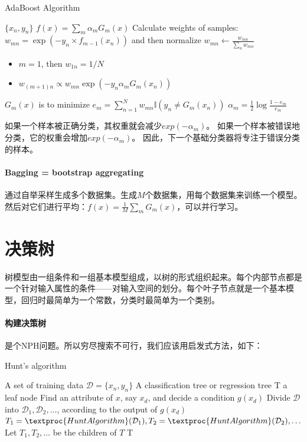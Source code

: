 \begin{algorithm}[H]
\caption{AdaBoost Algorithm}
\label{alg:AdaBoost}
\begin{algorithmic}[1]
\Require $\{x_n, y_n\}$
\Ensure $f(x) = \sum_m \alpha_mG_m(x)$
\State Calculate weights of samples: $w_{mn} = \exp(-y_n \times f_{m-1}(x_n))$ and then
normalize $w_{mn} \leftarrow \frac{w_{mn}}{\sum_n w_{mn}}$\begin{itemize}
    \item $m=1$, then $w_{1n} = 1/N$
    \item $w_{(m+1)n} \propto w_{mn}\exp(-y_n\alpha_mG_m(x_n))$
\end{itemize}
\State $G_m(x)$ is to minimize $e_m = \sum_{n=1}^N w_{mn}\mathbb{I}(y_n \neq G_m(x_n))$
\State $\alpha_m = \frac{1}{2} \log \frac{1-e_m}{e_m}$
\EndFor
\end{algorithmic}
\end{algorithm}

如果一个样本被正确分类，其权重就会减少$exp(-\alpha_m)$。
如果一个样本被错误地分类，它的权重会增加$exp(-\alpha_m)$。
因此，下一个基础分类器将专注于错误分类的样本。

\paragraph{Bagging = bootstrap aggregating} 通过自举采样生成多个数据集。生成$M$个数据集，用每个数据集来训练一个模型。然后对它们进行平均：$f(x) = \frac{1}{M} \sum_m G_m(x)$，可以并行学习。

\section{决策树}
树模型由一组条件和一组基本模型组成，以树的形式组织起来。每个内部节点都是一个针对输入属性的条件——对输入空间的划分。每个叶子节点就是一个基本模型，回归时最简单为一个常数，分类时最简单为一个类别。

\paragraph{构建决策树} 是个NPH问题。所以穷尽搜索不可行，我们应该用启发式方法，如下：
\begin{algorithm}[H]
\caption{Hunt's algorithm}
\label{alg:hunt}
\begin{algorithmic}[1]
\Require A set of training data $\mathcal{D} = \{x_n, y_n\}$
\Ensure A classification tree or regression tree T
\State \Return a leaf node
\Else
\State Find an attribute of $x$, say $x_d$, and decide a condition $g(x_d)$
\State Divide $\mathcal{D}$ into $\mathcal{D}_1, \mathcal{D}_2, \ldots$, according to the output of $g(x_d)$
\State $T_1 = \textproc{HuntAlgorithm}(\mathcal{D}_1), T_2 = \textproc{HuntAlgorithm}(\mathcal{D}_2), \ldots$
\State Let $T_1, T_2, \ldots$ be the children of $T$
\EndIf
\State \Return T
\EndFunction
\end{algorithmic}
\end{algorithm}

